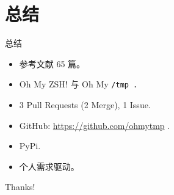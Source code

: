\documentclass{beamer}
\begin{document}
\section{总结}

\begin{frame}{总结}
    \begin{itemize}[<+-| alert@+>] %
        \item 参考文献 65 篇。
        \item Oh My ZSH! 与 Oh My \tt{/tmp} .
        \item 3 Pull Requests (2 Merge), 1 Issue.
        \item GitHub: \url{https://github.com/ohmytmp} .
        \item PyPi.
        \item 个人需求驱动。
    \end{itemize}
\end{frame}

\begin{frame}
    \begin{center}
        {\Huge\calligra Thanks!}
    \end{center}
\end{frame}
\end{document}
